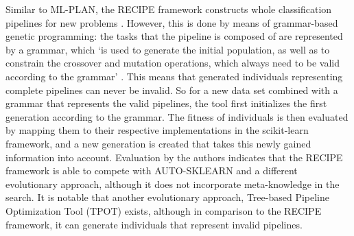 Similar to ML-PLAN, the RECIPE framework constructs whole classification pipelines for new problems \cite{DBLP:conf/eurogp/SaPOP17}. However, this is done by means of grammar-based genetic programming: the tasks that the pipeline is composed of are represented by a grammar, which `is used to generate the initial population, as well as to constrain the crossover and mutation operations, which always need to be valid according to the grammar' \cite{DBLP:conf/eurogp/SaPOP17}. This means that generated individuals representing complete pipelines can never be invalid. So for a new data set combined with a grammar that represents the valid pipelines, the tool first initializes the first generation according to the grammar. The fitness of individuals is then evaluated by mapping them to their respective implementations in the scikit-learn framework, and a new generation is created that takes this newly gained information into account. Evaluation by the authors indicates that the RECIPE framework is able to compete with AUTO-SKLEARN and a different evolutionary approach, although it does not incorporate meta-knowledge in the search. It is notable that another evolutionary approach, Tree-based Pipeline Optimization Tool (TPOT) \cite{olson2016automating} exists, although in comparison to the RECIPE framework, it can generate individuals that represent invalid pipelines.